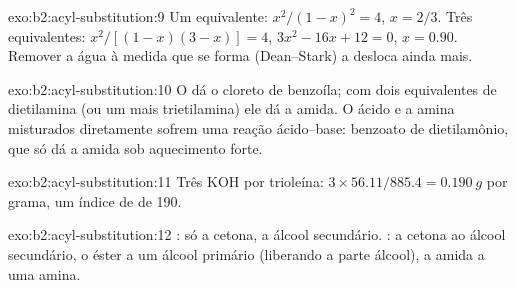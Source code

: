 \begin{solution}{exo:b2:acyl-substitution:9}
Um equivalente: $x^2/(1 - x)^2 = 4$, $x = 2/3$. Três equivalentes: $x^2/[(1 - x)(3 - x)] = 4$, $3x^2 - 16x
+ 12 = 0$, $x = 0.90$. Remover a água à medida que se forma (Dean--Stark) a desloca ainda mais.
\end{solution}

\begin{solution}{exo:b2:acyl-substitution:10}
O  dá o cloreto de benzoíla; com dois equivalentes de dietilamina (ou um mais
trietilamina) ele dá a amida. O ácido e a amina misturados diretamente sofrem uma reação
ácido--base: benzoato de dietilamônio, que só dá a amida sob aquecimento forte.
\end{solution}

\begin{solution}{exo:b2:acyl-substitution:11}
Três KOH por trioleína: $3 \times 56.11/885.4 = \qty{0.190}{g}$ por grama, um índice de 
de 190.
\end{solution}

\begin{solution}{exo:b2:acyl-substitution:12}
: só a cetona, a álcool secundário. : a cetona ao álcool secundário, o éster
a um álcool primário (liberando a parte álcool), a amida a uma amina.
\end{solution}

